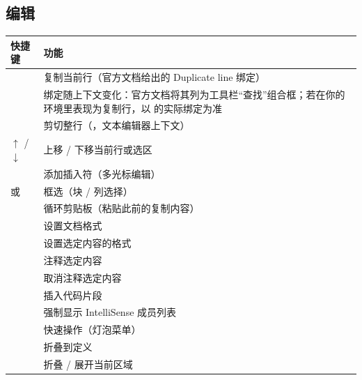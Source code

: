 \subsection{编辑}
\begin{longtable}{L{3.6cm}L{11.2cm}}
\toprule
\textbf{快捷键} & \textbf{功能} \\ \midrule
\endhead \bottomrule \endlastfoot
{} & 复制当前行（官方文档给出的 Duplicate line 绑定） \\
 & 绑定随上下文变化：官方文档将其列为工具栏“查找”组合框；若在你的环境里表现为复制行，以  的实际绑定为准 \\
 & 剪切整行（，文本编辑器上下文） \\
$\uparrow$ / $\downarrow$ & 上移 / 下移当前行或选区 \\
 & 添加插入符（多光标编辑） \\
 或  & 框选（块 / 列选择） \\
 & 循环剪贴板（粘贴此前的复制内容） \\
 & 设置文档格式 \\
 & 设置选定内容的格式 \\
 & 注释选定内容 \\
 & 取消注释选定内容 \\
 & 插入代码片段 \\
 & 强制显示 IntelliSense 成员列表 \\
 & 快速操作（灯泡菜单） \\
 & 折叠到定义 \\
 & 折叠 / 展开当前区域 \\
\end{longtable}
